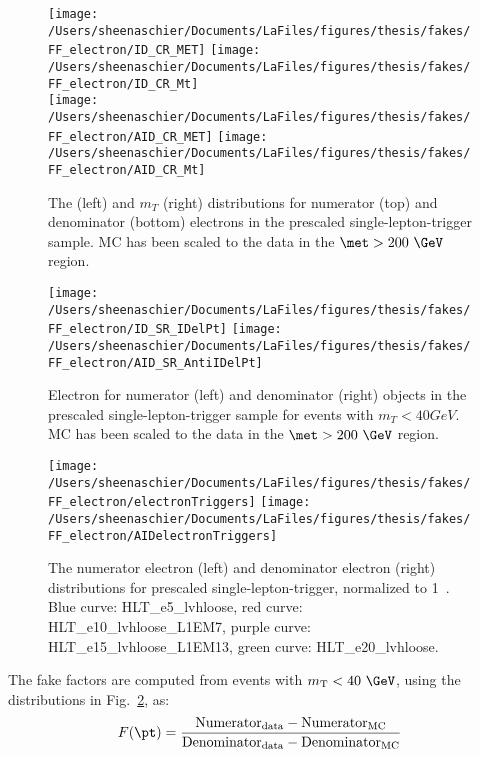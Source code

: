 \documentclass[11pt, oneside]{article}   	%
\begin{document}
\begin{figure}[tbp]
  \centering
  \texttt{[image: /Users/sheenaschier/Documents/LaFiles/figures/thesis/fakes/FF\_electron/ID\_CR\_MET]}
  \texttt{[image: /Users/sheenaschier/Documents/LaFiles/figures/thesis/fakes/FF\_electron/ID\_CR\_Mt]}\\
  \texttt{[image: /Users/sheenaschier/Documents/LaFiles/figures/thesis/fakes/FF\_electron/AID\_CR\_MET]}
  \texttt{[image: /Users/sheenaschier/Documents/LaFiles/figures/thesis/fakes/FF\_electron/AID\_CR\_Mt]}
  \caption{The \met{} (left) and $m_{T}$ (right) distributions for numerator (top) and denominator (bottom) electrons in the prescaled single-lepton-trigger sample.  MC has been scaled to the data in the $\met > 200~\GeV$ region.}
  \label{fig:elec_FF_dists_1}
\end{figure}

\begin{figure}[tbp]
  \centering
  \texttt{[image: /Users/sheenaschier/Documents/LaFiles/figures/thesis/fakes/FF\_electron/ID\_SR\_IDelPt]}
  \texttt{[image: /Users/sheenaschier/Documents/LaFiles/figures/thesis/fakes/FF\_electron/AID\_SR\_AntiIDelPt]}\\
  \caption{Electron \pt{} for numerator (left) and denominator (right) objects in the prescaled single-lepton-trigger sample for events with $m_{T} < 40 GeV$.  MC has been scaled to the data in the $\met > 200~\GeV$ region.}
  \label{fig:elec_FF_dists_pt}
\end{figure}

\begin{figure}[tbp]
  \centering
  \texttt{[image: /Users/sheenaschier/Documents/LaFiles/figures/thesis/fakes/FF\_electron/electronTriggers]}
  \texttt{[image: /Users/sheenaschier/Documents/LaFiles/figures/thesis/fakes/FF\_electron/AIDelectronTriggers]}\\
  \caption{The numerator electron (left) and denominator electron (right) \pt{} distributions for prescaled single-lepton-trigger, normalized to 1~\ipb{}. Blue curve: HLT\_e5\_lvhloose, red curve: HLT\_e10\_lvhloose\_L1EM7, purple curve: HLT\_e15\_lvhloose\_L1EM13, green curve: HLT\_e20\_lvhloose.}
  \label{fig:triggers}
\end{figure}

The fake factors are computed from events  with $m_{\mathrm{T}}<40~\GeV$, using the distributions in Fig.~\ref{fig:elec_FF_dists_pt}, as:
\begin{equation}
  F(\pt) = \frac{\mathrm{Numerator}_{\mathrm{data}} - \mathrm{Numerator}_{\mathrm{MC}}}{\mathrm{Denominator}_{\mathrm{data}} - \mathrm{Denominator}_{\mathrm{MC}}}
\end{equation}
\end{document}
